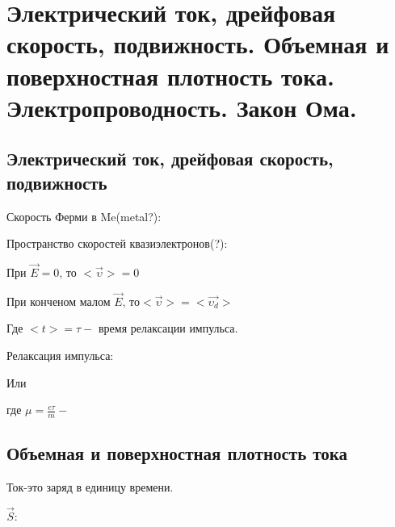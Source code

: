 \section{Электрический ток, дрейфовая скорость, подвижность. Объемная и
поверхностная плотность тока. Электропроводность. Закон Ома.}

\subsection*{Электрический ток, дрейфовая скорость, подвижность}

Скорость Ферми в Me(metal?):



Пространство скоростей квазиэлектронов(?):


При $\vec{E}=0\text{, то }<\vec{\upsilon}>=0$

При конченом малом $\vec{E}\text{, то} <\vec{\upsilon}>=<\vec{\upsilon_d}>$



Где $<t>=\tau-$ время релаксации импульса.

Релаксация импульса:

Или


где $\mu=\frac{e\tau }{m}-$

\newpage

\subsection*{Объемная и поверхностная плотность тока}

Ток-это заряд в единицу времени.

 


 $\vec{S}:$

